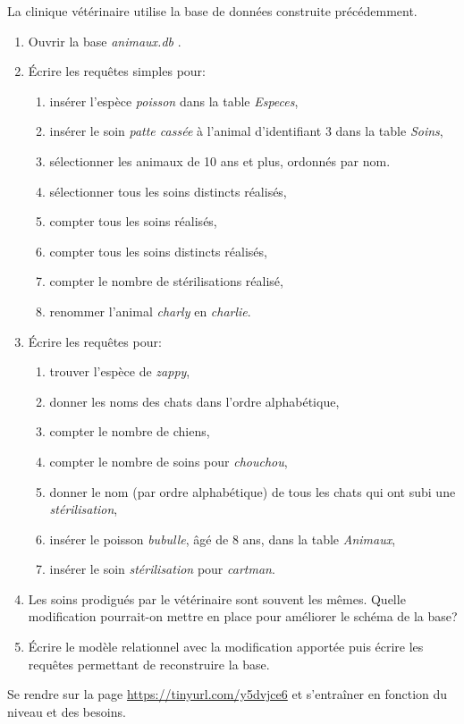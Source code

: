 \documentclass[a4paper,11pt]{article}
\begin{document}
\begin{Form}
\begin{exo}
La clinique vétérinaire utilise la base de données construite précédemment.
\begin{enumerate}
\item Ouvrir la base \emph{animaux.db} .
\item Écrire les requêtes simples pour:
\begin{enumerate}
\item insérer l'espèce \emph{poisson} dans la table \emph{Especes},
\item insérer le soin \emph{patte cassée} à l'animal d'identifiant 3 dans la table \emph{Soins},
\item sélectionner les animaux de 10 ans et plus, ordonnés par nom.
\item sélectionner tous les soins distincts réalisés,
\item compter tous les soins réalisés,
\item compter tous les soins distincts réalisés,
\item compter le nombre de stérilisations réalisé,
\item renommer l'animal \emph{charly} en \emph{charlie}.
\end{enumerate}
\item Écrire les requêtes pour:
\begin{enumerate}
\item trouver l'espèce de \emph{zappy},
\item donner les noms des chats dans l'ordre alphabétique,
\item compter le nombre de chiens,
\item compter le nombre de soins pour \emph{chouchou},
\item donner le nom (par ordre alphabétique) de tous les chats qui ont subi une \emph{stérilisation},
\item insérer le poisson \emph{bubulle}, âgé de 8 ans, dans la table \emph{Animaux},
\item insérer le soin \emph{stérilisation} pour \emph{cartman}.
\end{enumerate}
\item Les soins prodigués par le vétérinaire sont souvent les mêmes. Quelle modification pourrait-on mettre en place pour améliorer le schéma de la base?
\item Écrire le modèle relationnel avec la modification apportée puis écrire les requêtes permettant de reconstruire la base.
\end{enumerate}
\end{exo}
\begin{exo}
Se rendre sur la page \url{https://tinyurl.com/y5dvjce6} et s'entraîner en fonction du niveau et des besoins.
\end{exo}
\end{Form}
\end{document}
